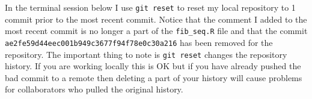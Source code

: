 \documentclass[
  letterpaper,
  DIV=11,
  numbers=noendperiod]{scrreprt}
\newenvironment{Shaded}{\begin{snugshade}}{\end{snugshade}}
\newcommand{\NormalTok}[1]{\textcolor[rgb]{0.00,0.23,0.31}{#1}}
\begin{document}
\begin{Shaded}
\end{Shaded}

In the terminal session below I use \texttt{git\ reset} to reset my
local repository to 1 commit prior to the most recent commit. Notice
that the comment I added to the most recent commit is no longer a part
of the \texttt{fib\_seq.R} file and that the commit
\texttt{ae2fe59d44eec001b949c3677f94f78e0c30a216} has been removed for
the repository. The important thing to note is \texttt{git\ reset}
changes the repository history. If you are working locally this is OK
but if you have already pushed the bad commit to a remote then deleting
a part of your history will cause problems for collaborators who pulled
the original history.
\end{document}
